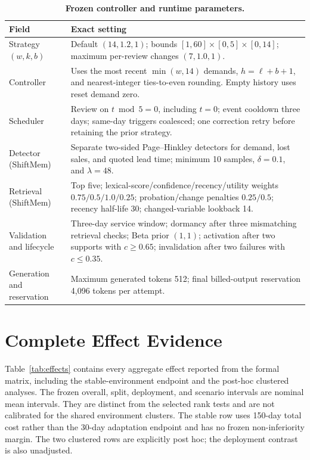 \begin{table}[t]
  \centering
  \scriptsize
  \caption{\textbf{Frozen controller and runtime parameters.}}
  \label{tab:runtime-parameters}
  \begin{tabular}{@{}p{}p{}@{}}
    \toprule
    Field & Exact setting \\
    \midrule
    Strategy $(w,k,b)$ & Default $(14,1.2,1)$; bounds
    $[1,60]\times[0,5]\times[0,14]$; maximum per-review changes $(7,1.0,1)$. \\
    Controller & Uses the most recent $\min(w,14)$ demands,
    $h=\ell+b+1$, and nearest-integer ties-to-even rounding. Empty history uses
    reset demand zero. \\
    Scheduler & Review on $t\bmod5=0$, including $t=0$; event cooldown three
    days; same-day triggers coalesced; one correction retry before retaining the
    prior strategy. \\
    Detector (ShiftMem) & Separate two-sided Page--Hinkley detectors for demand,
    lost sales, and quoted lead time; minimum 10 samples, $\delta=0.1$, and
    $\lambda=48$. \\
    Retrieval (ShiftMem) & Top five; lexical-score/confidence/recency/utility
    weights $0.75/0.5/1.0/0.25$; probation/change penalties $0.25/0.5$; recency
    half-life 30; changed-variable lookback 14. \\
    Validation and lifecycle & Three-day service window; dormancy after three
    mismatching retrieval checks; Beta prior $(1,1)$; activation after two
    supports with $c\geq0.65$; invalidation after two failures with $c\leq0.35$.
    \\
    Generation and reservation & Maximum generated tokens 512; final
    billed-output reservation 4,096 tokens per attempt. \\
    \bottomrule
  \end{tabular}
\end{table}

\section{Complete Effect Evidence}
\label{app:effects}

Table~\ref{tab:effects} contains every aggregate effect reported from the formal
matrix, including the stable-environment endpoint and the post-hoc clustered
analyses. The frozen overall, split, deployment, and scenario intervals are
nominal mean intervals. They are distinct from the selected rank tests and are
not calibrated for the shared environment clusters. The stable row uses 150-day
total cost rather than the 30-day adaptation endpoint and has no frozen
non-inferiority margin. The two clustered rows are explicitly post hoc; the
deployment contrast is also unadjusted.

